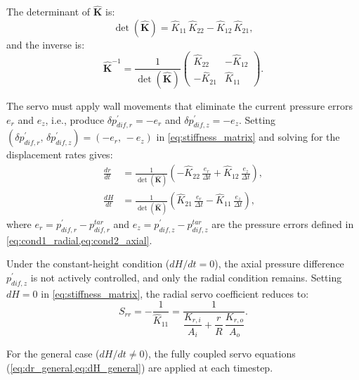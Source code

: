 The determinant of $\hat{\mathbf{K}}$ is:
\begin{equation}
\det(\hat{\mathbf{K}}) = \hat{K}_{11}\,\hat{K}_{22} - \hat{K}_{12}\,\hat{K}_{21},
\label{eq:det_K}
\end{equation}
and the inverse is:
\begin{equation}
\hat{\mathbf{K}}^{-1}
=
\frac{1}{\det(\hat{\mathbf{K}})}
\begin{pmatrix} \hat{K}_{22} & -\hat{K}_{12} \\[6pt] -\hat{K}_{21} & \hat{K}_{11} \end{pmatrix}.
\label{eq:stiffness_matrix_inv}
\end{equation}

The servo must apply wall movements that eliminate the current pressure errors $e_r$ and $e_z$, i.e., produce $\delta p_{dif,r}^{\prime}=-e_r$ and $\delta p_{dif,z}^{\prime}=-e_z$. Setting $(\delta p_{dif,r}^{\prime},\,\delta p_{dif,z}^{\prime})=(-e_r,\,-e_z)$ in \cref{eq:stiffness_matrix} and solving for the displacement rates gives:
\begin{align}
\frac{dr}{dt} &= \frac{1}{\det(\hat{\mathbf{K}})}\!\left(-\hat{K}_{22}\,\frac{e_r}{\Delta t} + \hat{K}_{12}\,\frac{e_z}{\Delta t}\right), \label{eq:dr_general}\\[6pt]
\frac{dH}{dt} &= \frac{1}{\det(\hat{\mathbf{K}})}\!\left(\hat{K}_{21}\,\frac{e_r}{\Delta t} - \hat{K}_{11}\,\frac{e_z}{\Delta t}\right), \label{eq:dH_general}
\end{align}
where $e_r=p_{dif,r}^{\prime}-p_{dif,r}^{tar}$ and $e_z=p_{dif,z}^{\prime}-p_{dif,z}^{tar}$ are the pressure errors defined in \cref{eq:cond1_radial,eq:cond2_axial}.

Under the constant-height condition ($dH/dt=0$), the axial pressure difference $p_{dif,z}^{\prime}$ is not actively controlled, and only the radial condition remains. Setting $dH=0$ in \cref{eq:stiffness_matrix}, the radial servo coefficient reduces to:
\begin{equation}
S_{rr} = -\frac{1}{\hat{K}_{11}} = \frac{1}{\dfrac{K_{r,i}}{A_i}+\dfrac{r}{R}\,\dfrac{K_{r,o}}{A_o}}.
\label{eq:Srr_constantH}
\end{equation}

For the general case ($dH/dt\neq 0$), the fully coupled servo equations (\cref{eq:dr_general,eq:dH_general}) are applied at each timestep.
